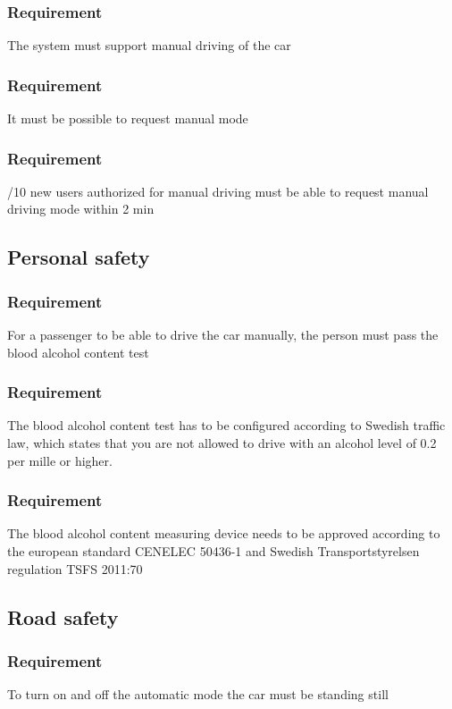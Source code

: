 \documentclass{article}
\begin{document}
{  
      \subsubsection{Requirement}
\hfill \break 
\- \- \-The system must support manual driving of the car
      \subsubsection{Requirement}
\hfill \break 
\- \- \-It must be possible to request manual mode
      \subsubsection{Requirement}
\hfill \break 
\- \- /10 new users authorized for manual driving must be able to request manual driving mode within 2 min
  \subsection{Personal safety}
      \subsubsection{Requirement}
\hfill \break 
\- \- \-For a passenger to be able to drive the car manually, the person must pass the blood alcohol content test
      \subsubsection{Requirement}
\hfill \break 
\- \- \-The blood alcohol content test has to be configured according to Swedish traffic law, which states that you are not allowed to drive with an alcohol level of 0.2 per mille or higher.
      \subsubsection{Requirement}
\hfill \break 
\- \- \-The blood alcohol content measuring device needs to be approved according to the european standard CENELEC 50436-1 and Swedish Transportstyrelsen regulation TSFS 2011:70
  \subsection{Road safety}
      \subsubsection{Requirement}
\hfill \break 
\- \- \-To turn on and off the automatic mode the car must be standing still
}
\end{document}
